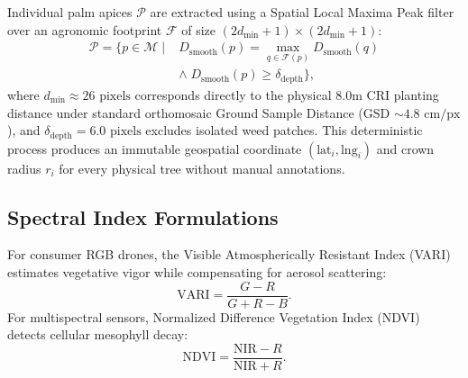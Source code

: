\documentclass[conference,a4paper]{IEEEtran}
\begin{document}
Individual palm apices $\mathcal{P}$ are extracted using a Spatial Local Maxima Peak filter over an agronomic footprint $\mathcal{F}$ of size $(2d_{\min} + 1) \times (2d_{\min} + 1)$:
\begin{equation}
\begin{aligned}
\mathcal{P} = \Big\{ p \in \mathcal{M} \;\Big|\; & D_{\text{smooth}}(p) = \max_{q \in \mathcal{F}(p)} D_{\text{smooth}}(q) \\
& \wedge\; D_{\text{smooth}}(p) \ge \delta_{\text{depth}} \Big\},
\end{aligned}
\label{eq:peaks}
\end{equation}
where $d_{\min} \approx 26\text{ pixels}$ corresponds directly to the physical $8.0\text{m}$ CRI planting distance under standard orthomosaic Ground Sample Distance (GSD $\sim 4.8\text{ cm/px}$), and $\delta_{\text{depth}} = 6.0\text{ pixels}$ excludes isolated weed patches. This deterministic process produces an immutable geospatial coordinate $(\text{lat}_i, \text{lng}_i)$ and crown radius $r_i$ for every physical tree without manual annotations.

\subsection{Spectral Index Formulations}
For consumer RGB drones, the Visible Atmospherically Resistant Index (VARI) estimates vegetative vigor while compensating for aerosol scattering:
\begin{equation}
\text{VARI} = \frac{G - R}{G + R - B}.
\label{eq:vari}
\end{equation}
For multispectral sensors, Normalized Difference Vegetation Index (NDVI) detects cellular mesophyll decay:
\begin{equation}
\text{NDVI} = \frac{\text{NIR} - R}{\text{NIR} + R}.
\label{eq:ndvi}
\end{equation}
\end{document}
